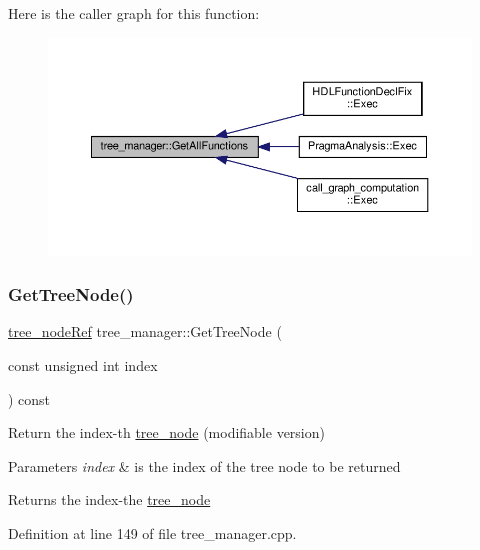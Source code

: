 Here is the caller graph for this function\+:
\nopagebreak
\begin{figure}[H]
\begin{center}
\leavevmode
\includegraphics[width=350pt]{d2/ddd/classtree__manager_a4371ea7d0da5c860644a78af338764b3_icgraph}
\end{center}
\end{figure}
\mbox{\label{classtree__manager_af4c6e92e486ed94a05c42a36e0825425}} 
\subsubsection{\texorpdfstring{Get\+Tree\+Node()}{GetTreeNode()}}
{\footnotesize\ttfamily \hyperlink{tree__node_8hpp_a6ee377554d1c4871ad66a337eaa67fd5}{tree\+\_\+node\+Ref} tree\+\_\+manager\+::\+Get\+Tree\+Node (\begin{DoxyParamCaption}\item[{const unsigned int}]{index }\end{DoxyParamCaption}) const}



Return the index-\/th \hyperlink{classtree__node}{tree\+\_\+node} (modifiable version) 


\begin{DoxyParams}{Parameters}
{\em index} & is the index of the tree node to be returned \\
\hline
\end{DoxyParams}
\begin{DoxyReturn}{Returns}
the index-\/the \hyperlink{classtree__node}{tree\+\_\+node} 
\end{DoxyReturn}


Definition at line 149 of file tree\+\_\+manager.\+cpp.



